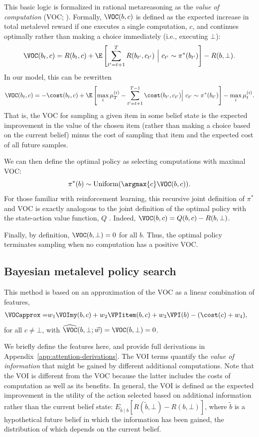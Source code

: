 This basic logic is formalized in rational metareasoning as the \textit{value of computation} (VOC; \citealp{russell1991principles}). Formally, $\VOC(b, c)$ is defined as the expected increase in total metalevel reward if one executes a single computation, $c$, and continues optimally rather than making a choice immediately (i.e., executing $\bot$):
$$
\VOC(b_t, c) = R(b_t, c) + \E \left[
  \sum_{t'=t+1}^T R(b_{t'}, c_{t'})\ \Big\vert\ c_{t'} \sim \pi^*(b_{t'}) 
\right] - R(b, \bot).
$$
In our model, this can be rewritten
$$
\VOC(b_t, c) = -\cost(b_t, c) + \E \left[ 
  \max_i \mu_T^{(i)} - \sum_{t'=t+1}^{T-1} \cost(b_{t'}, c_{t'})
  \Big\vert\ c_{t'} \sim \pi^*(b_{t'})
\right] -  \max_i \mu_t^{(i)}.
$$
That is, the VOC for sampling a given item in some belief state is the expected improvement in the value of the chosen item (rather than making a choice based on the current belief) minus the cost of sampling that item and the expected cost of all future samples.

We can then define the optimal policy as selecting computations with maximal VOC:
$$
\pi^*(b) \sim \text{Uniform}(\argmax{c} \VOC(b, c)).
$$
For those familiar with reinforcement learning, this recursive joint definition of $\pi^*$ and VOC is exactly analogous to the joint definition of the optimal policy with the state-action value function, $Q$ \citep{sutton2018reinforcement}. Indeed, $\VOC(b, c) = Q(b, c) - R(b, \bot)$. 

Finally, by definition, $\VOC(b,\bot)=0$ for all $b$. Thus, the optimal policy terminates sampling when no computation has a positive VOC.

\subsection{Bayesian metalevel policy search}\label{sec:BMPS}

This method is based on an approximation of the VOC as a linear combination of features,
\begin{equation}\label{eq:vochat}
  \begin{aligned}
    \VOCapprox =& w_{1}\VOImy(b,c)+w_{2}\VPIitem(b,c) +
     w_{3}\VPI(b) -(\cost(c)+w_{4}),
  \end{aligned}
\end{equation}
for all $c\neq\bot$, with $\widehat{\VOC}(b, \bot; \vec{w}) = \VOC(b,\bot)=0$.

We briefly define the features here, and provide full derivations in Appendix~\ref{app:attention-derivations}. The VOI terms quantify the \textit{value of information} \citep{howard1966information} that might be gained by different additional computations. Note that the VOI is different from the VOC because the latter includes the costs of computation as well as its benefits. In general, the VOI is defined as the expected improvement in the utility of the action selected based on additional information rather than the current belief state: $E_{\tilde{b} \mid b}[R(\tilde{b}, \bot) - R(b, \bot)]$, where $\tilde{b}$ is a hypothetical future belief in which the information has been gained, the distribution of which depends on the current belief.

